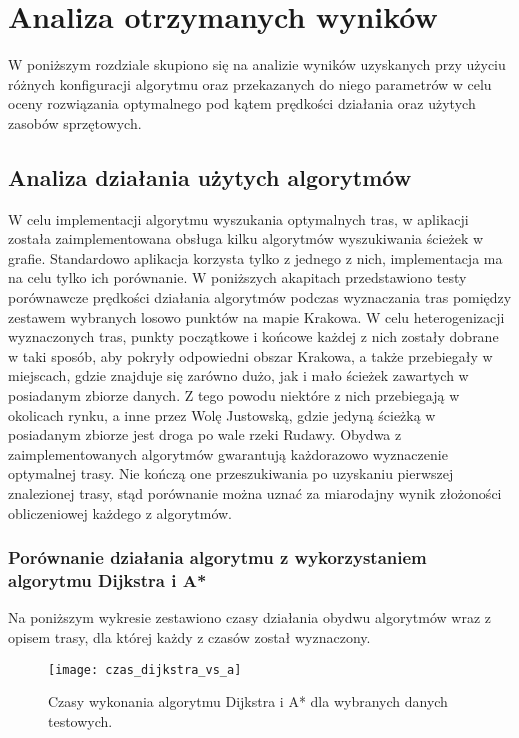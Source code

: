 \chapter{Analiza otrzymanych wyników}
\label{cha:analiza_otrzymanych_wynikow}

W poniższym rozdziale skupiono się na analizie wyników uzyskanych przy użyciu różnych konfiguracji algorytmu oraz przekazanych do niego parametrów w celu oceny rozwiązania optymalnego pod kątem prędkości działania oraz użytych zasobów sprzętowych.

\section{Analiza działania użytych algorytmów}

W celu implementacji algorytmu wyszukania optymalnych tras, w aplikacji została zaimplementowana obsługa kilku algorytmów wyszukiwania ścieżek w grafie. Standardowo aplikacja korzysta tylko z jednego z nich, implementacja ma na celu tylko ich porównanie. W poniższych akapitach przedstawiono testy porównawcze prędkości działania algorytmów podczas wyznaczania tras pomiędzy zestawem wybranych losowo punktów na mapie Krakowa. 
W celu heterogenizacji wyznaczonych tras, punkty początkowe i końcowe każdej z nich zostały dobrane w taki sposób, aby pokryły odpowiedni obszar Krakowa, a także przebiegały w miejscach, gdzie znajduje się zarówno dużo, jak i mało ścieżek zawartych w posiadanym zbiorze danych. Z tego powodu niektóre z nich przebiegają w okolicach rynku, a inne przez Wolę Justowską, gdzie jedyną ścieżką w posiadanym zbiorze jest droga po wale rzeki Rudawy.
Obydwa z zaimplementowanych algorytmów gwarantują każdorazowo wyznaczenie optymalnej trasy. Nie kończą one przeszukiwania po uzyskaniu pierwszej znalezionej trasy, stąd porównanie można uznać za miarodajny wynik złożoności obliczeniowej każdego z algorytmów.

\subsection{Porównanie działania algorytmu z wykorzystaniem algorytmu Dijkstra i A*}

Na poniższym wykresie zestawiono czasy działania obydwu algorytmów wraz z opisem trasy, dla której każdy z czasów został wyznaczony.

\begin{figure}[H]
\centering
\texttt{[image: czas\_dijkstra\_vs\_a]}
\caption{Czasy wykonania algorytmu Dijkstra i A* dla wybranych danych testowych.}
\end{figure}

